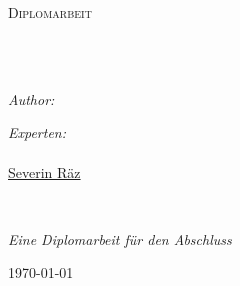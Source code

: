 \documentclass[
  11pt, %
  oneside, %
  ngerman, %
  singlespacing, %
  liststotoc, %
  headsepline, %
]{MastersDoctoralThesis} %
\author{Damian Senn} %
\begin{document}
\frontmatter %

\pagestyle{plain} %



\begin{titlepage}
  \begin{center}

    \vspace*{.06\textheight}
    {\scshape\LARGE \univname\par}\vspace{1.5cm} %
    \textsc{\Large Diplomarbeit}\\[0.5cm] %

    \HRule \\[0.4cm] %
    {\huge \bfseries \ttitle\par}\vspace{0.4cm} %
    \HRule \\[1.5cm] %

    \begin{minipage}[t]{0.4\textwidth}
      \begin{flushleft} \large
        \emph{Author:}\\
        \href{mailto:damian.senn@gmail.com}{\authorname} %
      \end{flushleft}
    \end{minipage}
    \begin{minipage}[t]{0.4\textwidth}
      \begin{flushright} \large
        \emph{Experten:} \\
        \href{mailto:sandro@bertolino.ch}{\supname}\\
        \href{mailto:raez@puzzle.ch}{Severin Räz}
      \end{flushright}
    \end{minipage}\\[3cm]

    \vfill

    \large \textit{Eine Diplomarbeit für den Abschluss \degreename}\\[0.3cm] %

    \vfill

    {\large \today}\\[4cm] %

    \vfill
  \end{center}
\end{titlepage}
\end{document}
